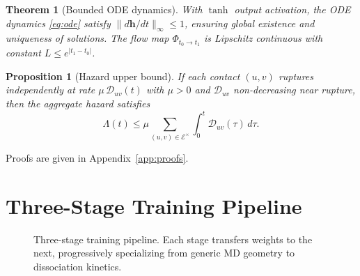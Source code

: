\documentclass{article}
\newtheorem{theorem}{Theorem}
\newtheorem{proposition}{Proposition}
\begin{document}
\begin{theorem}[Bounded ODE dynamics]
\label{thm:bounded}
With $\tanh$ output activation, the ODE dynamics
\eqref{eq:ode} satisfy $\|d\mathbf{h}/dt\|_\infty \le 1$, ensuring
global existence and uniqueness of solutions.  The flow map
$\Phi_{t_0 \to t_1}$ is Lipschitz continuous with constant
$L \le e^{|t_1 - t_0|}$.
\end{theorem}

\begin{proposition}[Hazard upper bound]
\label{prop:hazard}
If each contact $(u,v)$ ruptures independently at rate
$\mu\,\mathcal{D}_{uv}(t)$ with $\mu > 0$ and
$\mathcal{D}_{uv}$ non-decreasing near rupture, then the aggregate
hazard satisfies
\begin{equation}
  \Lambda(t)
  \le \mu \sum_{(u,v) \in \mathcal{E}^\times}
  \int_0^t \mathcal{D}_{uv}(\tau)\,d\tau.
  \label{eq:hazardbound}
\end{equation}
\end{proposition}

Proofs are given in Appendix~\ref{app:proofs}.

\section{Three-Stage Training Pipeline}
\label{sec:training}

\begin{figure}[t]
\centering
{}
\caption{Three-stage training pipeline.  Each stage transfers weights
  to the next, progressively specializing from generic MD geometry
  to dissociation kinetics.}
\label{fig:training}
\end{figure}
\end{document}
